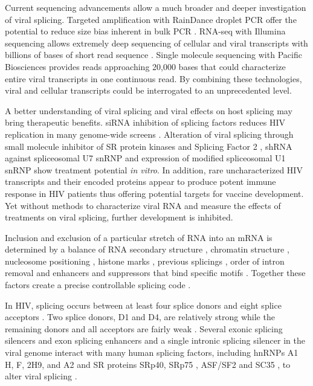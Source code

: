 \documentclass[../sherrill-Mix_thesis.tex]{subfiles}
\begin{document}
	Current sequencing advancements allow a much broader and deeper investigation of viral splicing. Targeted amplification with RainDance droplet PCR offer the potential to reduce size bias inherent in bulk PCR \citep{Tewhey2009}. RNA-seq with Illumina sequencing allows extremely deep sequencing of cellular and viral transcripts with billions of bases of short read sequence \citep{Marioni2008,Morin2008}. Single molecule sequencing with Pacific Biosciences provides reads approaching 20,000 bases \citep{Eid2009,Schaefer2012} that could characterize entire viral transcripts in one continuous read. By combining these technologies, viral and cellular transcripts could be interrogated to an unprecedented level.

	A better understanding of viral splicing and viral effects on host splicing may bring therapeutic benefits. siRNA inhibition of splicing factors reduces HIV replication in many genome-wide screens \citep{Brass2008,Konig2008,Bushman2009}. Alteration of viral splicing through small molecule inhibitor of SR protein kinases\citep{Fukuhara2006} and Splicing Factor 2 \citep{Bakkour2007}, shRNA against spliceosomal U7 snRNP \citep{Asparuhova2007} and expression of modified spliceosomal U1 snRNP \citep{Mandal2010} show treatment potential \emph{in vitro}. In addition, rare uncharacterized HIV transcripts and their encoded proteins appear to produce potent immune response in HIV patients \citep{Bansal2010} thus offering potential targets for vaccine development. Yet without methods to characterize viral RNA and measure the effects of treatments on viral splicing, further development is inhibited. 

	Inclusion and exclusion of a particular stretch of RNA into an mRNA is determined by a balance of RNA secondary structure \citep{Buratti2004,Jablonski2008,Shepard2008}, chromatin structure \citep{Allo2009}, nucleosome positioning \citep{Tilgner2009}, histone marks \citep{Schwartz2009}, previous splicings \citep{Crabb2010}, order of intron removal \citep{Takahara2002,Mata2010} and enhancers \citep{Zahler1993} and suppressors \citep{Smith2000} that bind specific motifs \citep{Ule2006}. Together these factors create a precise controllable splicing code \citep{Barash2010,Xiong2011,Witten2011}.  

	 In HIV, splicing occurs between at least four splice donors and eight splice acceptors \citep{Stoltzfus2009}. Two splice donors, D1 and D4, are relatively strong while the remaining donors and all acceptors are fairly weak \citep{O'Reilly1995}. Several exonic splicing silencers \citep{Amendt1994,Levengood2012} and exon splicing enhancers \citep{Caputi2004,Asang2008} and a single intronic splicing silencer \citep{Tange2001} in the viral genome interact with many human splicing factors, including hnRNPs A1 \citep{Tange2001, Levengood2012} H, F, 2H9, and A2 \citep{Jablonski2008} and SR proteins SRp40\citep{Caputi2004,Tranell2010}, SRp75 \citep{Tranell2010}, ASF/SF2 \citep{Caputi2004} and SC35 \citep{Jablonski2008}, to alter viral splicing \citep{Stoltzfus2006,Stoltzfus2009}.
\end{document}
